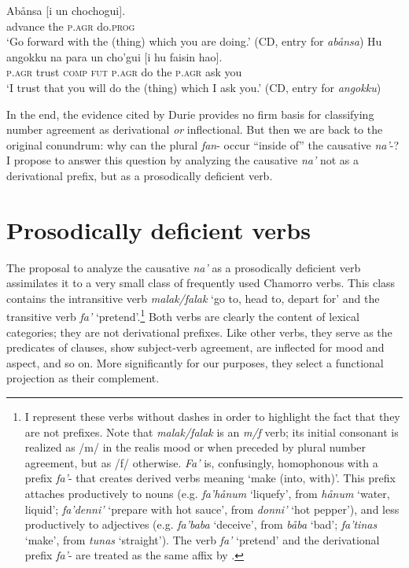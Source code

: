 \documentclass[output=paper,
modfonts
]{LSP/langsci}
\begin{document}
\begin{exe}
\begin{xlist}
\ea
	\ea\gll  Abånsa {[}i un chochogui{]}.\\
		advance the \textsc{p.agr} do.\textsc{prog}\\
		\glt `Go forward with the (thing) which you are doing.' (CD, entry for
		\emph{abånsa})
	\ex \gll Hu angokku na para un cho'gui {[}i hu faisin hao{]}.\\
		\textsc{p.agr} trust \textsc{comp} \textsc{fut} \textsc{p.agr} do the \textsc{p.agr} ask
		you\\
		\glt `I trust that you will do the (thing) which I ask you.' (CD, entry for
		\emph{angokku})
	\z
\z

In the end, the evidence cited by Durie provides no firm basis for
classifying number agreement as derivational \emph{or} inflectional. But
then we are back to the original conundrum: why can the plural
\emph{fan}- occur ``inside of'' the causative \emph{na'}-? I propose to
answer this question by analyzing the causative \emph{na'} not as a
derivational prefix, but as a prosodically deficient verb.

\section{Prosodically deficient verbs}

The proposal to analyze the causative \emph{na'} as a prosodically
deficient verb assimilates it to a very small class of frequently used
Chamorro verbs. This class contains the intransitive verb
\emph{malak/falak} `go to, head to, depart for' and the transitive verb
\emph{fa'} `pretend'.\footnote{I represent these verbs without dashes in
  order to highlight the fact that they are not prefixes. Note that
  \emph{malak/falak} is an \emph{m/f} verb; its initial consonant is
  realized as /m/ in the realis mood or when preceded by plural number
  agreement, but as /f/ otherwise. \emph{Fa'} is, confusingly,
  homophonous with a prefix \emph{fa'}- that creates derived verbs
  meaning `make (into, with)'. This prefix attaches productively to
  nouns (e.g. \emph{fa'hånum} `liquefy', from \emph{hånum} `water,
  liquid'; \emph{fa'denni'} `prepare with hot sauce', from \emph{donni'}
  `hot pepper'), and less productively to adjectives (e.g.
  \emph{fa'baba} `deceive', from \emph{båba} `bad'; \emph{fa'tinas}
  `make', from \emph{tunas} `straight'). The verb \emph{fa'} `pretend'
  and the derivational prefix \emph{fa'}- are treated as the same affix
  by  \citet[176--77]{topping1973}.} Both verbs are clearly the
content of lexical categories; they are not derivational prefixes. Like
other verbs, they serve as the predicates of clauses, show subject-verb
agreement, are inflected for mood and aspect, and so on. More
significantly for our purposes, they select a functional projection as
their complement.


\end{xlist}
\end{exe}
\end{document}
